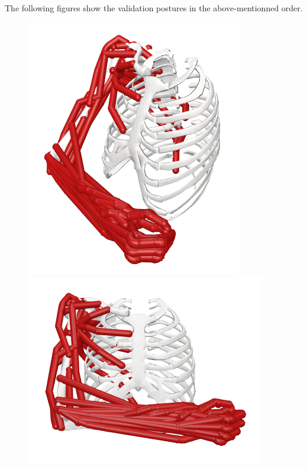 The following figures show the validation postures in the above-mentionned order.

\begin{figure}[!htb]
    \centering
    \captionsetup{justification=centering}
    \begin{minipage}{0.3\linewidth}
        \centering
        \includegraphics[trim={0 0 0 0}, clip, width=0.6\linewidth]{img/chapter_4/pose_5_view.png}
    \end{minipage}
    \hfill
    \begin{minipage}{0.3\linewidth}
        \captionsetup{justification=centering}
        \centering
        \includegraphics[trim={0 0 0 0}, clip, width=0.8\linewidth]{img/chapter_4/pose_5_front.png}
    \end{minipage}
    \hfill
    \begin{minipage}{0.3\linewidth}
        \captionsetup{justification=centering}

\end{minipage}
\end{figure}
